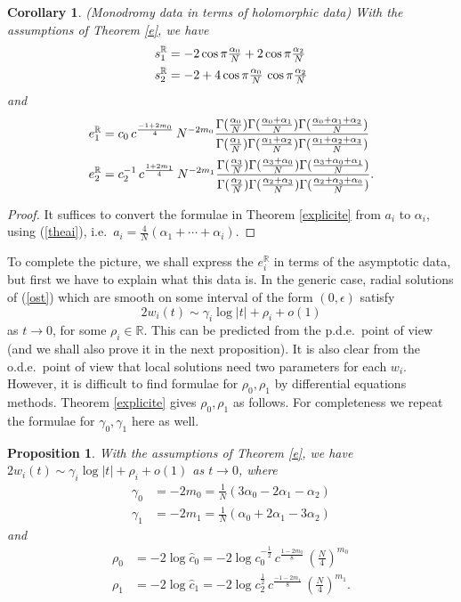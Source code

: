 \documentclass[a4paper,12pt,leqno]{amsart}
\numberwithin{equation}{section}
\theoremstyle{plain}
\newtheorem{proposition}[theorem]{Proposition}
\newtheorem{corollary}[theorem]{Corollary}
\theoremstyle{definition}
\newcommand{\R}{\mathbb R}
\newcommand{\al}{\alpha}
\newcommand{\ga}{\gamma}
\newcommand{\eps}{\epsilon}
\newcommand{\Ga}{\Gamma}
\newcommand{\nn}{m}
\newcommand{\pal}{\vphantom{{A_A}_A}\al}  %
\begin{document}
\begin{corollary}\label{explicitehol} 
{\em(Monodromy data in terms of holomorphic data)}
With the assumptions of Theorem \ref{e}, we have
\begin{align*}
s_1^\R &
=
-2\cos \pi \tfrac{ \pal_0}N +  2\cos \pi \tfrac{ \pal_2}N
\\
s_2^\R &
=
-2+4\cos \pi \tfrac{ \pal_0}N \, \cos \pi \tfrac{\pal_2}N
\end{align*}
and
\begin{align*}
e^\R_1&=
c_0 \, c^{ \frac{-1+2\nn_0}{4} }\, N^{-2\nn_0}
\frac
{
\Ga(  \frac{\pal_0}{N}  )
\Ga(  \frac{\pal_0+\pal_1}{N})
\Ga(  \frac{\pal_0+\pal_1+\pal_2}{N})
}
{
\Ga(  \frac{\pal_1}{N})
\Ga(  \frac{\pal_1+\pal_2}{N})
\Ga(  \frac{\pal_1+\pal_2+\pal_3}{N})
}
\\
e^\R_2&= c_2^{-1} \, c^{ \frac{1+2\nn_1}{4} }\, N^{-2\nn_1}
\frac
{
\Ga(  \frac{\pal_3}{N}  )
\Ga(  \frac{\pal_3+\pal_0}{N})
\Ga(  \frac{\pal_3+\pal_0+\pal_1}{N})
}
{
\Ga(  \frac{\pal_2}{N})
\Ga(  \frac{\pal_2+\pal_3}{N})
\Ga(  \frac{\pal_2+\pal_3+\pal_0}{N})
}.
\end{align*}
\end{corollary}

\begin{proof}  It suffices to convert the formulae in Theorem \ref{explicite}
from $a_i$ to $\al_i$, using (\ref{theai}), i.e.\ 
$a_i=\tfrac4N(\al_1+\cdots+\al_i)$.
\end{proof} 

To complete the picture, we shall express the $e_i^\R$ in terms of the asymptotic data, but first we have to explain what this data is.
In the generic case, radial solutions of (\ref{ost}) which are smooth on some interval of the form $(0,\eps)$ satisfy
\[
2w_i(t)\sim \ga_i \log\vert t\vert+\rho_i + o(1)
\]
as $t\to 0$, for some $\rho_i\in\R$.  
This can be predicted from the p.d.e.\ point of view (and we shall also prove it in the next proposition).   It is also clear from the o.d.e.\ point of view that local solutions need two parameters for each $w_i$.
However, it is difficult to find formulae for $\rho_0,\rho_1$
by differential equations methods. Theorem \ref{explicite} gives $\rho_0,\rho_1$ as follows. For completeness we repeat the formulae for $\ga_0,\ga_1$ here as well.  

\begin{proposition}\label{asymptoticdata} With the assumptions of Theorem \ref{e}, we have 
$2w_i(t)\sim \ga_i \log\vert t\vert+\rho_i + o(1)$
as $t\to 0$, where
\begin{align*}
\ga_0 &= -2\nn_0 = \tfrac1{N}(3\al_0-2\al_1-\al_2)
\\
\ga_1&=  -2\nn_1 = \tfrac1{N}(\al_0+2\al_1-3\al_2)
\end{align*}
and
\begin{align*}
\rho_0&= - 2\log \hat c_0 =
-2\log 
c_0^{-\frac12} \, c^{ \frac{1-2\nn_0}{8} }\, \left( \tfrac N4 \right)^{\nn_0}
\\
\rho_1&= - 2\log \hat c_1 =
-2\log
c_2^{\frac12} \, c^{ \frac{-1-2\nn_1}{8} }\, \left( \tfrac N4 \right)^{\nn_1}.
\end{align*}
\end{proposition}
\end{document}
